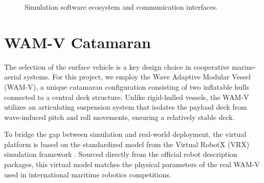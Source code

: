     \begin{figure}[htbp]
        \centering
        \caption{Simulation software ecosystem and communication interfaces.}
        \label{fig:software_architecture}
    \end{figure}

\section{WAM-V Catamaran}
\label{sec:usv_model}

The selection of the surface vehicle is a key design choice in cooperative marine-aerial systems. For this project, we employ the Wave Adaptive Modular Vessel (WAM-V), a unique catamaran configuration consisting of two inflatable hulls connected to a central deck structure. Unlike rigid-hulled vessels, the WAM-V utilizes an articulating suspension system that isolates the payload deck from wave-induced pitch and roll movements, ensuring a relatively stable deck.

To bridge the gap between simulation and real-world deployment, the virtual platform is based on the standardized model from the Virtual RobotX (VRX) simulation framework \cite{bingham2019vrx}. Sourced directly from the official robot description packages, this virtual model matches the physical parameters of the real WAM-V used in international maritime robotics competitions.

